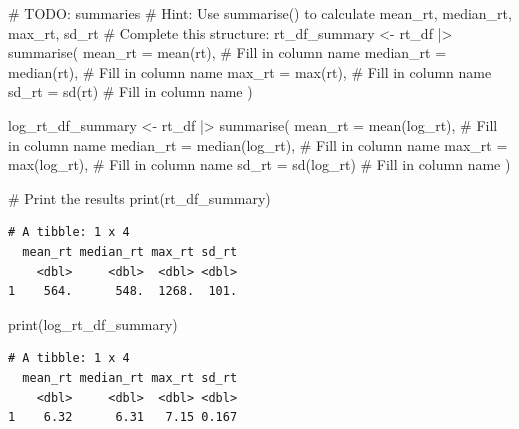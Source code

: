 \documentclass[
  letterpaper,
  DIV=11,
  numbers=noendperiod]{scrartcl}
\newenvironment{Shaded}{\begin{snugshade}}{\end{snugshade}}
\newcommand{\AlertTok}[1]{\textcolor[rgb]{0.68,0.00,0.00}{#1}}
\newcommand{\AttributeTok}[1]{\textcolor[rgb]{0.40,0.45,0.13}{#1}}
\newcommand{\CommentTok}[1]{\textcolor[rgb]{0.37,0.37,0.37}{#1}}
\newcommand{\FunctionTok}[1]{\textcolor[rgb]{0.28,0.35,0.67}{#1}}
\newcommand{\NormalTok}[1]{\textcolor[rgb]{0.00,0.23,0.31}{#1}}
\newcommand{\OtherTok}[1]{\textcolor[rgb]{0.00,0.23,0.31}{#1}}
\newcommand{\SpecialCharTok}[1]{\textcolor[rgb]{0.37,0.37,0.37}{#1}}
\begin{document}
\begin{Shaded}
\begin{Highlighting}[]
\CommentTok{\# }\AlertTok{TODO}\CommentTok{: summaries}
\CommentTok{\# Hint: Use summarise() to calculate mean\_rt, median\_rt, max\_rt, sd\_rt}
\CommentTok{\# Complete this structure:}
\NormalTok{rt\_df\_summary }\OtherTok{\textless{}{-}}\NormalTok{ rt\_df }\SpecialCharTok{|\textgreater{}}
  \FunctionTok{summarise}\NormalTok{(}
    \AttributeTok{mean\_rt =} \FunctionTok{mean}\NormalTok{(rt),    }\CommentTok{\# Fill in column name}
    \AttributeTok{median\_rt =} \FunctionTok{median}\NormalTok{(rt), }\CommentTok{\# Fill in column name}
    \AttributeTok{max\_rt =} \FunctionTok{max}\NormalTok{(rt),      }\CommentTok{\# Fill in column name}
    \AttributeTok{sd\_rt =} \FunctionTok{sd}\NormalTok{(rt)         }\CommentTok{\# Fill in column name}
\NormalTok{  )}

\NormalTok{log\_rt\_df\_summary }\OtherTok{\textless{}{-}}\NormalTok{ rt\_df }\SpecialCharTok{|\textgreater{}}
  \FunctionTok{summarise}\NormalTok{(}
    \AttributeTok{mean\_rt =} \FunctionTok{mean}\NormalTok{(log\_rt),    }\CommentTok{\# Fill in column name}
    \AttributeTok{median\_rt =} \FunctionTok{median}\NormalTok{(log\_rt), }\CommentTok{\# Fill in column name}
    \AttributeTok{max\_rt =} \FunctionTok{max}\NormalTok{(log\_rt),      }\CommentTok{\# Fill in column name}
    \AttributeTok{sd\_rt =} \FunctionTok{sd}\NormalTok{(log\_rt)         }\CommentTok{\# Fill in column name}
\NormalTok{  )}

\CommentTok{\# Print the results}
\FunctionTok{print}\NormalTok{(rt\_df\_summary)}
\end{Highlighting}
\end{Shaded}

\begin{verbatim}
# A tibble: 1 x 4
  mean_rt median_rt max_rt sd_rt
    <dbl>     <dbl>  <dbl> <dbl>
1    564.      548.  1268.  101.
\end{verbatim}

\begin{Shaded}
\begin{Highlighting}[]
\FunctionTok{print}\NormalTok{(log\_rt\_df\_summary)}
\end{Highlighting}
\end{Shaded}

\begin{verbatim}
# A tibble: 1 x 4
  mean_rt median_rt max_rt sd_rt
    <dbl>     <dbl>  <dbl> <dbl>
1    6.32      6.31   7.15 0.167
\end{verbatim}
\end{document}
